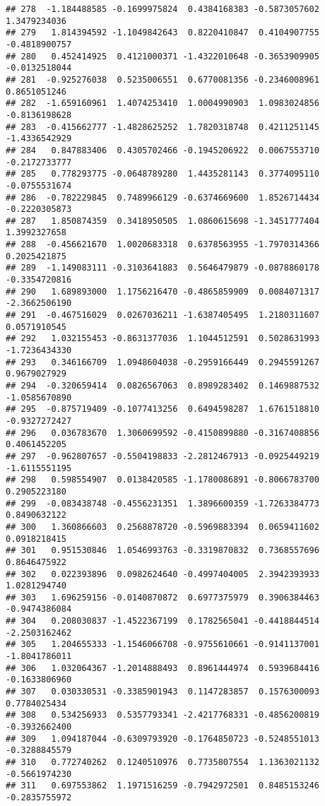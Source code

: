\documentclass[
]{article}
\begin{document}
\begin{verbatim}
## 278  -1.184488585 -0.1699975824  0.4384168383 -0.5873057602  1.3479234036
## 279   1.814394592 -1.1049842643  0.8220410847  0.4104907755 -0.4818900757
## 280   0.452414925  0.4121000371 -1.4322010648 -0.3653909905 -0.0132518044
## 281  -0.925276038  0.5235006551  0.6770081356 -0.2346008961  0.8651051246
## 282  -1.659160961  1.4074253410  1.0004990903  1.0983024856 -0.8136198628
## 283  -0.415662777 -1.4828625252  1.7820318748  0.4211251145 -1.4336542929
## 284   0.847883406  0.4305702466 -0.1945206922  0.0067553710 -0.2172733777
## 285   0.778293775 -0.0648789280  1.4435281143  0.3774095110 -0.0755531674
## 286  -0.782229845  0.7489966129 -0.6374669600  1.8526714434 -0.2220305873
## 287   1.850874359  0.3418950505  1.0860615698 -1.3451777404  1.3992327658
## 288  -0.456621670  1.0020683318  0.6378563955 -1.7970314366  0.2025421875
## 289  -1.149083111 -0.3103641883  0.5646479879 -0.0878860178 -0.3354720816
## 290   1.689893000  1.1756216470 -0.4865859909  0.0084071317 -2.3662506190
## 291  -0.467516029  0.0267036211 -1.6387405495  1.2180311607  0.0571910545
## 292   1.032155453 -0.8631377036  1.1044512591  0.5028631993 -1.7236434330
## 293   0.346166709  1.0948604038 -0.2959166449  0.2945591267  0.9679027929
## 294  -0.320659414  0.0826567063  0.8989283402  0.1469887532 -1.0585670890
## 295  -0.875719409 -0.1077413256  0.6494598287  1.6761518810 -0.9327272427
## 296   0.036783670  1.3060699592 -0.4150899880 -0.3167408856  0.4061452205
## 297  -0.962807657 -0.5504198833 -2.2812467913 -0.0925449219 -1.6115551195
## 298   0.598554907  0.0138420585 -1.1780086891 -0.8066783700  0.2905223180
## 299  -0.083438748 -0.4556231351  1.3896600359 -1.7263384773  0.8490632122
## 300   1.360866603  0.2568878720 -0.5969883394  0.0659411602  0.0918218415
## 301   0.951530846  1.0546993763 -0.3319870832  0.7368557696  0.8646475922
## 302   0.022393896  0.0982624640 -0.4997404005  2.3942393933  1.0281294740
## 303   1.696259156 -0.0140870872  0.6977375979  0.3906384463 -0.9474386084
## 304   0.208030837 -1.4522367199  0.1782565041 -0.4418844514 -2.2503162462
## 305   1.204655333 -1.1546066708 -0.9755610661 -0.9141137001 -1.8041786011
## 306   1.032064367 -1.2014888493  0.8961444974  0.5939684416 -0.1633806960
## 307   0.030330531 -0.3385901943  0.1147283857  0.1576300093  0.7784025434
## 308   0.534256933  0.5357793341 -2.4217768331 -0.4856200819 -0.3932662400
## 309   1.094187044 -0.6309793920 -0.1764850723 -0.5248551013 -0.3288845579
## 310   0.772740262  0.1240510976  0.7735807554  1.1363021132 -0.5661974230
## 311   0.697553862  1.1971516259 -0.7942972501  0.8485153246 -0.2835755972

\end{verbatim}
\end{document}
